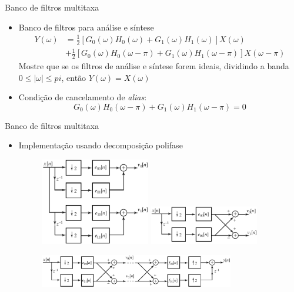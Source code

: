 \begin{slide}{Banco de filtros multitaxa}
	\begin{itemize}
		\item Banco de filtros para análise e síntese
			\begin{align*}
				Y(\omega) &= \frac{1}{2}\left [ G_0(\omega)H_0(\omega)+G_1(\omega)H_1(\omega)\right ] X(\omega)\\
				          &+\frac{1}{2} \left [ G_0(\omega)H_0(\omega-\pi)+G_1(\omega)H_1(\omega-\pi)\right ] X(\omega-\pi)
					  \end{align*}
					  Mostre que se os filtros de análise e síntese forem ideais, dividindo a banda $0\leq |\omega|\leq pi$, então $Y(\omega) = X(\omega)$
				  \item Condição de cancelamento de \emph{alias}:
					  \begin{equation*}
						  G_0(\omega)H_0(\omega-\pi)+G_1(\omega)H_1(\omega-\pi)= 0
					  \end{equation*}

	\end{itemize}

\end{slide}
\begin{slide}{Banco de filtros multitaxa}
	\begin{itemize}
		\item Implementação usando decomposição polifase
	\begin{figure}
				\centering
				\includegraphics[width=0.45\textwidth]{figs/4-45a.eps}
				\includegraphics[width=0.45\textwidth]{figs/4-45b.eps}
			\end{figure}
			
\begin{figure}
				\centering
				\includegraphics[width=0.8\textwidth]{figs/4-46.eps}
				
			\end{figure}
	\end{itemize}
\end{slide}

	

